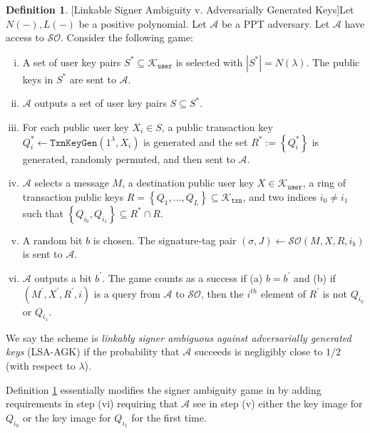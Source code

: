 \documentclass{mrl}
\theoremstyle{definition}
\newtheorem{defn}[theorem]{Definition}
\begin{document}
\begin{defn}{[Linkable Signer Ambiguity v. Adversarially Generated Keys]}\label{def:ambig} Let $N(-), L(-)$ be a positive polynomial. Let $\mathcal{A}$ be a PPT adversary. Let $\mathcal{A}$ have access to $\mathcal{SO}$. Consider the following game:
\begin{enumerate}[(i)]

\item A set of user key pairs $S^* \subseteq \mathcal{K}_{\texttt{user}}$ is selected with $\left|S^*\right| = N(\lambda)$. The public keys in $S^*$ are sent to $\mathcal{A}$.

\item $\mathcal{A}$ outputs a set of user key pairs $S \subseteq S^*$.

\item For each public user key $X_i \in S$, a public transaction key $Q^*_i \leftarrow \texttt{TxnKeyGen}(1^\lambda, X_i)$ is generated and the set $R^* := \left\{Q^*_i\right\}$ is generated, randomly permuted, and then sent to $\mathcal{A}$.

\item $\mathcal{A}$ selects a message $M$, a destination public user key $X \in \mathcal{K}_{\texttt{user}}$, a ring of transaction public keys $R=\left\{Q_1, \ldots, Q_L\right\} \subseteq \mathcal{K}_{\texttt{txn}}$, and two indices $i_0 \neq i_1$ such that $\left\{Q_{i_0}, Q_{i_1}\right\} \subseteq R^* \cap R$.

\item A random bit $b$ is chosen. The signature-tag pair $(\sigma,J) \leftarrow \mathcal{SO}(M,X,R,i_b)$ is sent to $\mathcal{A}$.

\item $\mathcal{A}$ outputs a bit $b^{\prime}$. The game counts as a success if (a) $b = b^{\prime}$ and (b) if $(M^{\prime},X^{\prime},R^{\prime},i)$ is a query from $\mathcal{A}$ to $\mathcal{SO}$, then the $i^{th}$ element of $R^{\prime}$ is not $Q_{i_0}$ or $Q_{i_1}$.

\end{enumerate}
We say the scheme is \textit{linkably signer ambiguous against adversarially generated keys} (LSA-AGK) if the probability that $\mathcal{A}$ succeeds is negligibly close to $1/2$ (with respect to $\lambda$).
\end{defn}

Definition \ref{def:ambig} essentially modifies the signer ambiguity game in \cite{bender2006ring} by adding requirements in step (vi) requiring that $\mathcal{A}$ see in step (v) either the key image for $Q_{i_0}$ or the key image for $Q_{i_1}$ for the first time.
\end{document}
